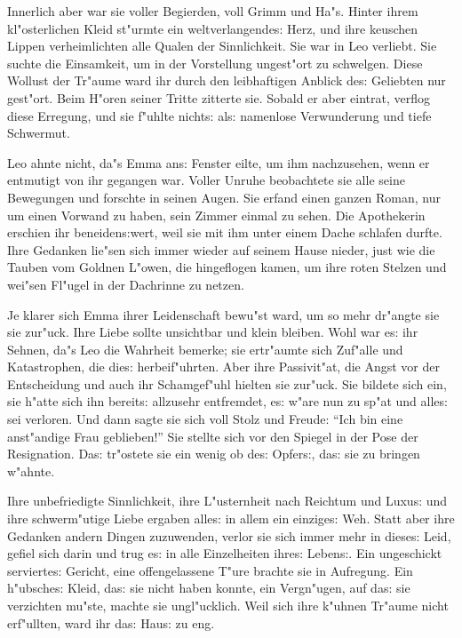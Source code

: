 \documentclass[oneside,12pt]{book}
\newcommand{\s}{s:}%
\begin{document}
Innerlich aber war sie voller Begierden, voll Grimm und Ha"s.
Hinter ihrem kl"osterlichen Kleid st"urmte ein weltverlangende{\s}
Herz, und ihre keuschen Lippen verheimlichten alle Qualen der
Sinnlichkeit. Sie war in Leo verliebt. Sie suchte die Einsamkeit,
um in der Vorstellung ungest"ort zu schwelgen. Diese Wollust der
Tr"aume ward ihr durch den leibhaftigen Anblick de{\s} Geliebten
nur gest"ort. Beim H"oren seiner Tritte zitterte sie. Sobald er
aber eintrat, verflog diese Erregung, und sie f"uhlte nicht{\s}
al{\s} namenlose Verwunderung und tiefe Schwermut.

Leo ahnte nicht, da"s Emma an{\s} Fenster eilte, um ihm
nachzusehen, wenn er entmutigt von ihr gegangen war. Voller Unruhe
beobachtete sie alle seine Bewegungen und forschte in seinen
Augen. Sie erfand einen ganzen Roman, nur um einen Vorwand zu
haben, sein Zimmer einmal zu sehen. Die Apothekerin erschien ihr
beneiden{\s}wert, weil sie mit ihm unter einem Dache schlafen
durfte. Ihre Gedanken lie"sen sich immer wieder auf seinem Hause
nieder, just wie die Tauben vom Goldnen L"owen, die hingeflogen
kamen, um ihre roten Stelzen und wei"sen Fl"ugel in der Dachrinne
zu netzen.

Je klarer sich Emma ihrer Leidenschaft bewu"st ward, um so mehr
dr"angte sie sie zur"uck. Ihre Liebe sollte unsichtbar und klein
bleiben. Wohl war e{\s} ihr Sehnen, da"s Leo die Wahrheit bemerke;
sie ertr"aumte sich Zuf"alle und Katastrophen, die die{\s}
herbeif"uhrten. Aber ihre Passivit"at, die Angst vor der
Entscheidung und auch ihr Schamgef"uhl hielten sie zur"uck. Sie
bildete sich ein, sie h"atte sich ihn bereit{\s} allzusehr
entfremdet, e{\s} w"are nun zu sp"at und alle{\s} sei verloren.
Und dann sagte sie sich voll Stolz und Freude: "`Ich bin eine
anst"andige Frau geblieben!"' Sie stellte sich vor den Spiegel in
der Pose der Resignation. Da{\s} tr"ostete sie ein wenig ob de{\s}
Opfer{\s}, da{\s} sie zu bringen w"ahnte.

Ihre unbefriedigte Sinnlichkeit, ihre L"usternheit nach Reichtum
und Luxu{\s} und ihre schwerm"utige Liebe ergaben alle{\s} in
allem ein einzige{\s} Weh. Statt aber ihre Gedanken andern Dingen
zuzuwenden, verlor sie sich immer mehr in diese{\s} Leid, gefiel
sich darin und trug e{\s} in alle Einzelheiten ihre{\s} Leben{\s}.
Ein ungeschickt servierte{\s} Gericht, eine offengelassene T"ure
brachte sie in Aufregung. Ein h"ubsche{\s} Kleid, da{\s} sie nicht
haben konnte, ein Vergn"ugen, auf da{\s} sie verzichten mu"ste,
machte sie ungl"ucklich. Weil sich ihre k"uhnen Tr"aume nicht
erf"ullten, ward ihr da{\s} Hau{\s} zu eng.
\end{document}
